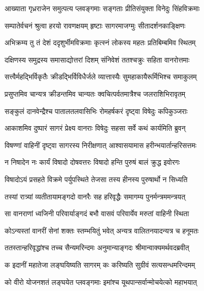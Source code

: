 
\twolineshloka
{आख्याता गृध्रराजेन समुत्पत्य प्लवङ्गमाः}
{सङ्गताः प्रीतिसंयुक्ता विनेदुः सिंहविक्रमाः} %

\twolineshloka
{सम्पातेर्वचनं श्रुत्वा हरयो रावणक्षयम्}
{हृष्टाः सागरमाजग्मुः सीतादर्शनकाङ्क्षिणः} %

\twolineshloka
{अभिक्रम्य तु तं देशं ददृशुर्भीमविक्रमाः}
{कृत्स्नं लोकस्य महतः प्रतिबिम्बमिव स्थितम्} %

\twolineshloka
{दक्षिणस्य समुद्रस्य समासाद्योत्तरां दिशम्}
{संनिवेशं ततश्चक्रुः सहिता वानरोत्तमाः} %

\twolineshloka
{सत्त्वैर्महद्भिर्विकृतैः क्रीडद्भिर्विविधैर्जले}
{व्यात्तास्यैः सुमहाकायैरूर्मिभिश्च समाकुलम्} %

\twolineshloka
{प्रसुप्तमिव चान्यत्र क्रीडन्तमिव चान्यतः}
{क्वचित्पर्वतमात्रैश्च जलराशिभिरावृतम्} %

\twolineshloka
{सङ्कुलं दानवेन्द्रैश्च पातालतलवासिभिः}
{रोमहर्षकरं दृष्ट्वा विषेदुः कपिकुञ्जराः} %

\twolineshloka
{आकाशमिव दुष्पारं सागरं प्रेक्ष्य वानराः}
{विषेदुः सहसा सर्वे कथं कार्यमिति ब्रुवन्} %

\twolineshloka
{विषण्णां वाहिनीं दृष्ट्वा सागरस्य निरीक्षणात्}
{आश्वासयामास हरीन्भयार्तान्हरिसत्तमः} %

\twolineshloka
{न निषादेन नः कार्यं विषादो दोषवत्तरः}
{विषादो हन्ति पुरुषं बालं क्रुद्ध इवोरगः} %

\twolineshloka
{विषादोऽयं प्रसहते विक्रमे पर्युपस्थिते}
{तेजसा तस्य हीनस्य पुरुषार्थो न सिध्यति} %

\twolineshloka
{तस्यां रात्र्यां व्यतीतायामङ्गदो वानरैः सह}
{हरिवृद्धैः समागम्य पुनर्मन्त्रममन्त्रयत्} %

\twolineshloka
{सा वानराणां ध्वजिनी परिवार्याङ्गदं बभौ}
{वासवं परिवार्येव मरुतां वाहिनी स्थिता} %

\twolineshloka
{कोऽन्यस्तां वानरीं सेनां शक्तः स्तम्भयितुं भवेत्}
{अन्यत्र वालितनयादन्यत्र च हनूमतः} %

\twolineshloka
{ततस्तान्हरिवृद्धांश्च तच्च सैन्यमरिन्दमः}
{अनुमान्याङ्गदः श्रीमान्वाक्यमर्थवदब्रवीत्} %

\twolineshloka
{क इदानीं महातेजा लङ्घयिष्यति सागरम्}
{कः करिष्यति सुग्रीवं सत्यसन्धमरिन्दमम्} %

\twolineshloka
{को वीरो योजनशतं लङ्घयेत प्लवङ्गमाः}
{इमांश्च यूथपान्सर्वान्मोचयेत्को महाभयात्} %


